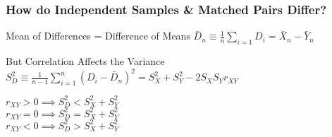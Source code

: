 \begin{frame}
  \frametitle{How do Independent Samples \& Matched Pairs Differ?}
  
  \begin{block}{Mean of Differences = Difference of Means}
    $\bar{D}_n \equiv \frac{1}{n} \sum_{i=1} D_i  =  \bar{X}_n - \bar{Y}_n$
  \end{block}

  \begin{block}{But Correlation Affects the Variance}
    $S_D^2 \equiv \frac{1}{n-1} \sum_{i=1}^n (D_i - \bar{D}_n)^2 =  S_X^2 + S_Y^2 - 2 S_X S_Y r_{XY}$
    \vspace{1em}


\alert{$\boxed{r_{XY} > 0 \implies S_D^2 < S_X^2 + S_Y^2}$} \\ 
\alert{$\boxed{r_{XY} = 0 \implies S_D^2 = S_X^2 + S_Y^2}$} \\ 
\alert{$\boxed{r_{XY} < 0 \implies S_D^2 > S_X^2 + S_Y^2}$}
  \end{block}

\end{frame}
%
%
%
